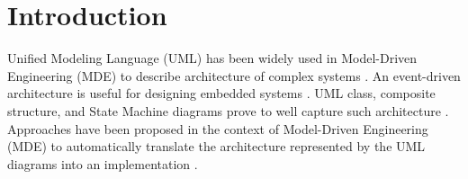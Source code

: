 \section{Introduction}
\label{sec:intro}





Unified Modeling Language (UML) has been widely used in Model-Driven Engineering (MDE) to describe architecture of complex systems \cite{HUTCHINSON2014144}.
An event-driven architecture is useful for designing 
embedded systems \cite{Dunkels:2006:PSE:1182807.1182811}.
UML class, composite structure, and State Machine diagrams prove to well capture such architecture \cite{possepapyrusrt}.    
Approaches have been proposed in the context of Model-Driven Engineering (MDE) to automatically translate the architecture represented by the UML diagrams into an implementation \cite{possepapyrusrt}.

